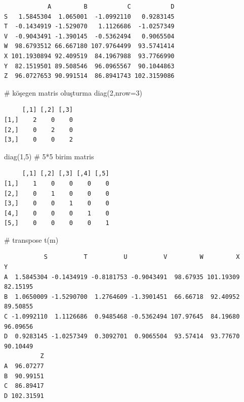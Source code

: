 \documentclass[
  letterpaper,
  DIV=11,
  numbers=noendperiod]{scrreprt}
\newenvironment{Shaded}{\begin{snugshade}}{\end{snugshade}}
\newcommand{\AttributeTok}[1]{\textcolor[rgb]{0.40,0.45,0.13}{#1}}
\newcommand{\CommentTok}[1]{\textcolor[rgb]{0.37,0.37,0.37}{#1}}
\newcommand{\DecValTok}[1]{\textcolor[rgb]{0.68,0.00,0.00}{#1}}
\newcommand{\FunctionTok}[1]{\textcolor[rgb]{0.28,0.35,0.67}{#1}}
\newcommand{\NormalTok}[1]{\textcolor[rgb]{0.00,0.23,0.31}{#1}}
\begin{document}
\begin{verbatim}
            A         B           C           D
S   1.5845304  1.065001  -1.0992110   0.9283145
T  -0.1434919 -1.529070   1.1126686  -1.0257349
V  -0.9043491 -1.390145  -0.5362494   0.9065504
W  98.6793512 66.667180 107.9764499  93.5741414
X 101.1930894 92.409519  84.1967988  93.7766990
Y  82.1519501 89.508546  96.0965567  90.1044863
Z  96.0727653 90.991514  86.8941743 102.3159086
\end{verbatim}

\begin{Shaded}
\begin{Highlighting}[]
\CommentTok{\# köşegen matris oluşturma}
\FunctionTok{diag}\NormalTok{(}\DecValTok{2}\NormalTok{,}\AttributeTok{nrow=}\DecValTok{3}\NormalTok{)}
\end{Highlighting}
\end{Shaded}

\begin{verbatim}
     [,1] [,2] [,3]
[1,]    2    0    0
[2,]    0    2    0
[3,]    0    0    2
\end{verbatim}

\begin{Shaded}
\begin{Highlighting}[]
\FunctionTok{diag}\NormalTok{(}\DecValTok{1}\NormalTok{,}\DecValTok{5}\NormalTok{) }\CommentTok{\# 5*5 birim matris}
\end{Highlighting}
\end{Shaded}

\begin{verbatim}
     [,1] [,2] [,3] [,4] [,5]
[1,]    1    0    0    0    0
[2,]    0    1    0    0    0
[3,]    0    0    1    0    0
[4,]    0    0    0    1    0
[5,]    0    0    0    0    1
\end{verbatim}

\begin{Shaded}
\begin{Highlighting}[]
\CommentTok{\# transpose}
\FunctionTok{t}\NormalTok{(m)}
\end{Highlighting}
\end{Shaded}

\begin{verbatim}
           S          T          U          V         W         X        Y
A  1.5845304 -0.1434919 -0.8181753 -0.9043491  98.67935 101.19309 82.15195
B  1.0650009 -1.5290700  1.2764609 -1.3901451  66.66718  92.40952 89.50855
C -1.0992110  1.1126686  0.9485468 -0.5362494 107.97645  84.19680 96.09656
D  0.9283145 -1.0257349  0.3092701  0.9065504  93.57414  93.77670 90.10449
          Z
A  96.07277
B  90.99151
C  86.89417
D 102.31591
\end{verbatim}
\end{document}
